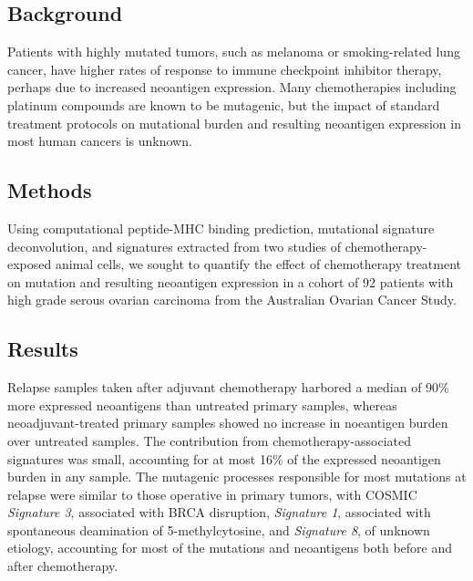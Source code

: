 \subsection*{Background}
Patients with highly mutated tumors, such as melanoma or smoking-related lung cancer, have higher rates of response to immune checkpoint inhibitor therapy, perhaps due to increased neoantigen expression. Many chemotherapies including platinum compounds are known to be mutagenic, but the impact of standard treatment protocols on mutational burden and resulting neoantigen expression in most human cancers is unknown.


\subsection*{Methods}

Using computational peptide-MHC binding prediction, mutational signature deconvolution, and signatures extracted from two studies of chemotherapy-exposed animal cells, we sought to quantify the effect of chemotherapy treatment on mutation and resulting neoantigen expression in a cohort of 92 patients with high grade serous ovarian carcinoma from the Australian Ovarian Cancer Study.


\subsection*{Results}
Relapse samples taken after adjuvant chemotherapy harbored a median of 90\% more expressed neoantigens than untreated primary samples, whereas neoadjuvant-treated primary samples showed no increase in noeantigen burden over untreated samples. The contribution from chemotherapy-associated signatures was small, accounting for at most 16\% of the expressed neoantigen burden in any sample. The mutagenic processes responsible for most mutations at relapse were similar to those operative in primary tumors, with COSMIC \textit{Signature 3}, associated with BRCA disruption, \textit{Signature 1}, associated with spontaneous deamination of 5-methylcytosine, and \textit{Signature 8}, of unknown etiology, accounting for most of the mutations and neoantigens both before and after chemotherapy.

